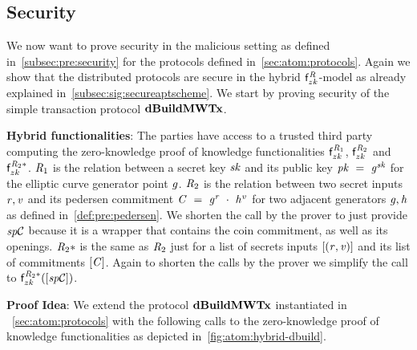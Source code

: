 \subsection{Security}\label{subsec:atom:security}

We now want to prove security in the malicious setting as defined in~\cref{subsec:pre:security} for the protocols defined in~\cref{sec:atom:protocols}.
Again we show that the distributed protocols are secure in the hybrid $\mathsf{f}^{\mathit{R}}_{zk}$-model as already explained in~\cref{subsec:sig:secureaptscheme}.
We start by proving security of the simple transaction protocol $\mathbf{dBuildMWTx}$.

\textbf{Hybrid functionalities}: The parties have access to a trusted third party computing the zero-knowledge proof of knowledge functionalities $\mathsf{f}^{\mathit{R}_1}_{zk}$, $\mathsf{f}^{\mathit{R}_2}_{zk}$ and $\mathsf{f}^{\mathit{R}_2*}_{zk}$.
$\mathit{R}_1$ is the relation between a secret key $\mathit{sk}$ and its public key $\mathit{pk} ~=~ \mathit{g}^{\mathit{sk}}$ for the elliptic curve generator point $\mathit{g}$.
$\mathit{R}_2$ is the relation between two secret inputs $\mathit{r}, \mathit{v}$ and its pedersen commitment $\mathit{C} ~=~ \mathit{g}^{\mathit{r}} ~\cdot~ \mathit{h}^{\mathit{v}}$ for two adjacent generators $\mathit{g}, \mathit{h}$ as defined in~\cref{def:pre:pedersen}.
We shorten the call by the prover to just provide $\mathit{sp}\mathcal{C}$ because it is a wrapper that contains the coin commitment, as well as its openings.
$\mathit{R}_2*$ is the same as $\mathit{R}_2$ just for a list of secrets inputs $[(\mathit{r}, \mathit{v})]$ and its list of commitments $[\mathit{C}]$.
Again to shorten the calls by the prover we simplify the call to $\mathsf{f}^{\mathit{R}_2*}_{zk}([\mathit{sp}\mathcal{C}])$.

\textbf{Proof Idea}: We extend the protocol $\mathbf{dBuildMWTx}$ instantiated in ~\cref{sec:atom:protocols} with the following calls to the zero-knowledge proof of knowledge functionalities as depicted in~\cref{fig:atom:hybrid-dbuild}.

